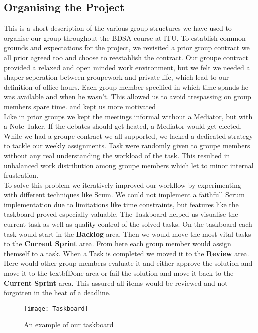 \subsection{Organising the Project}
This is a short description of the various group structures we have used to organise our group throughout the BDSA course at ITU. To establish common grounds and expectations for the project, we revisited a prior group contract we all prior agreed too and choose to reestablish the contract. Our groupe contract provided a relaxed and open minded work environment, but we felt we needed a shaper seperation between groupework and private life, which lead to our definition of office hours. Each group member specified in which time spands he was available and when he wasn't.  This allowed us to avoid trespassing on group members spare time. and kept us more motivated\\  
Like in prior groups we kept the meetings informal without a Mediator,  but with a Note Taker. If the debates should  get heated, a Mediator would get elected.
\\While we had a groupe contract we all supported, we lacked a dedicated strategy to tackle our weekly assignments. Task were randomly given to groupe members without any real understanding the workload of the task. This resulted in unbalanced work distribution among groupe members which let to minor internal frustration. \\
To solve this problem we iteratively improved our workflow by experimenting with  different techniques like Scum. We could not implement a faithfull Scrum implementation due to limitations like time constraints, but features like the taskboard proved especially valuable. The Taskboard helped us visualise the current task as well as quality control of the solved tasks. On the taskboard each task would start in the \textbf{Backlog} area. Then we would move the most vital tasks to the \textbf{Current Sprint} area. From here each group member would assign themself to a task. When a Task is completed we moved it to the \textbf{Review} area.  Here would other group members evaluate it and either approve the solution and move it to the textbf{Done} area or fail the solution and move it back to the \textbf{Current Sprint} area. This assured all items would be reviewed and not forgotten in the heat of a deadline. 


\begin{figure}[H]
	\texttt{[image: Taskboard]}
	\caption{An example of our taskboard}
	\label{fig:rad}
\end{figure}